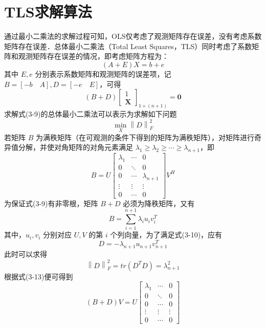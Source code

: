 \section{TLS求解算法}
通过最小二乘法的求解过程可知，OLS仅考虑了观测矩阵存在误差，没有考虑系数矩阵存在误差．总体最小二乘法（Total Least Squares，TLS）同时考虑了系数矩阵和观测矩阵存在误差的情况，即考虑矩阵方程为：
\begin{equation}
	(A+E)X = b + e
\end{equation}
其中 $E,e$ 分别表示系数矩阵和观测矩阵的误差项，记 $B = [-b \quad A],D = [-e \quad E]$，可得
\begin{equation}
	(B+D) \left[\begin{array}{c}
		1 \\ \bm{X}
	\end{array} \right]_{1\times (n+1)}= \bm{0}
\end{equation}
求解式(3-9)的总体最小二乘法可以表示为求解如下问题 
\begin{equation}
	\min_{X} \left\|D\right\|_F^2 
\end{equation}
若矩阵 $B$ 为满秩矩阵（在可观测的条件下得到的矩阵为满秩矩阵），对矩阵进行奇异值分解，并使对角矩阵的对角元素满足 $\lambda_1 \geq \lambda_2 \geq \cdots \geq \lambda_{n+1}$，即
\begin{equation}
	B = U \left[\begin{array}{ccc}
		\lambda_1 & \cdots & 0 \\
		0& \ddots & 0 \\
		0 & \cdots & \lambda_{n+1} \\
		\vdots & \vdots & \vdots \\
		0 & \cdots & 0
	\end{array}\right] V^H
\end{equation}
为保证式(3-9)有非零根，矩阵 $B+D$ 必须为降秩矩阵，又有
\begin{equation}
	B = \sum_{i=1}^{n+1}\lambda_i u_i v_i^T
\end{equation}
其中，$u_i,v_i$ 分别对应 $U,V$ 的第 $i$ 个列向量，为了满足式(3-10)，应有
\begin{equation}
	D = -\lambda_{n+1} u_{n+1} v_{n+1}^T
\end{equation}
此时可以求得
\begin{equation}
	\left\| D \right\|_F^2 = tr(D^TD) = \lambda_{n+1}^2
\end{equation}
根据式(3-13)便可得到
\begin{equation}
	(B+D)V = U\left[\begin{array}{ccc}
		\lambda_1 & \cdots & 0 \\
		0& \ddots & 0 \\
		0 & \cdots & 0 \\
		\vdots & \vdots & \vdots \\
		0 & \cdots & 0
	\end{array}\right]
\end{equation}
